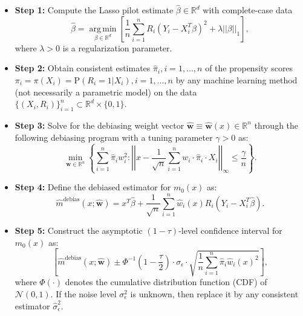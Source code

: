 \documentclass[ejsv2,noshowframe]{imsart}
\theoremstyle{plain}
\theoremstyle{definition}
\theoremstyle{remark}
\DeclareMathOperator*{\argmin}{arg\,min}
\newcommand{\norm}[1]{\left|\left| #1 \right|\right|}
\renewcommand{\hat}{\widehat}
\begin{document}
\begin{itemize}
	\item {\bf Step 1:} Compute the Lasso pilot estimate $\hat{\beta} \in \mathbb{R}^d$ with complete-case data
	\begin{equation}
		\label{lasso_pilot}
		\hat{\beta} = \argmin\limits_{\beta\in \mathbb{R}^d} \left[\frac{1}{n}\sum\limits_{i=1}^n R_i (Y_i-X_i^T \beta)^2+ \lambda\norm{\beta}_1 \right],
	\end{equation}
	where $\lambda>0$ is a regularization parameter.
	
	\item {\bf Step 2:} Obtain consistent estimates $\hat{\pi}_i,i=1,...,n$ of the propensity scores $\pi_i=\pi(X_i)=\mathrm{P}(R_i=1|X_i), i=1,...,n$ by any machine learning method (not necessarily a parametric model) on the data $\{(X_i,R_i)\}_{i=1}^n \subset \mathbb{R}^d \times \{0,1\}$. 
	
	\item {\bf Step 3:} Solve for the debiasing weight vector $\hat{\bm{w}} \equiv \hat{\bm{w}}(x) \in \mathbb{R}^n$ through the following debiasing program with a tuning parameter $\gamma >0$ as:
	\begin{equation}
		\label{debias_prog}
		\min_{\bm{w} \in \mathbb{R}^n} \left\{\sum_{i=1}^n \hat{\pi}_iw_i^2: \norm{x- \frac{1}{\sqrt{n}}\sum_{i=1}^n w_i\cdot \hat{\pi}_i\cdot X_i }_{\infty} \leq \frac{\gamma}{n} \right\}.
	\end{equation}
	
	\item {\bf Step 4:} Define the debiased estimator for $m_0(x)$ as:
	\begin{equation}
		\label{debias_est}
		\hat{m}^{\text{debias}}(x;\hat{\bm{w}}) = x^T \hat{\beta} + \frac{1}{\sqrt{n}} \sum_{i=1}^n \hat{w}_i(x)R_i \left(Y_i-X_i^T \hat{\beta} \right).
	\end{equation}
	
	\item {\bf Step 5:} Construct the asymptotic $(1-\tau)$-level confidence interval for $m_0(x)$ as:
	\begin{equation}
		\label{asym_ci}
		\left[\hat{m}^{\text{debias}}(x;\hat{\bm{w}}) \pm \Phi^{-1}\left(1-\frac{\tau}{2}\right) \cdot \sigma_{\epsilon}\cdot \sqrt{\frac{1}{n}\sum_{i=1}^n \hat{\pi}_i \hat{w}_i(x)^2}\right],
	\end{equation}
	where $\Phi(\cdot)$ denotes the cumulative distribution function (CDF) of $\mathcal{N}(0,1)$. If the noise level $\sigma_{\epsilon}^2$ is unknown, then replace it by any consistent estimator $\hat{\sigma}_{\epsilon}^2$. 
\end{itemize}
\end{document}
